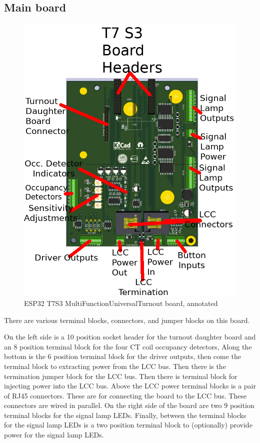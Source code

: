 \subsection{Main board}
\begin{figure}[hbpt]\begin{centering}%
\includegraphics[width=5in]{ESP32-T7S3-MultiFunctionUniversalTurnout-Annotated.png}
\caption{ESP32 T7S3 MultiFunctionUniversalTurnout board, annotated}
\end{centering}\end{figure}

There are various terminal blocks, connectors, and jumper blocks on this
board.  

On the left side is a 10 position socket header for the turnout daughter board
and an 8 position terminal block for the four CT coil occupancy detectors,
Along the bottom is the 6 position terminal block for the driver outputs, then
come the terminal block to extracting power from the LCC bus. Then there is
the termination jumper block for the LCC bus. Then there is terminal block for
injecting power into the LCC bus. Above the LCC power terminal blocks is a
pair of RJ45 connectors. These are for connecting the board to the LCC bus.
These connectors are wired in parallel. On the right side of the board are two
9 position terminal blocks for the signal lamp LEDs. Finally, between the
terminal blocks for the signal lamp LEDs is a two position terminal block to
(optionally) provide power for the signal lamp LEDs.

